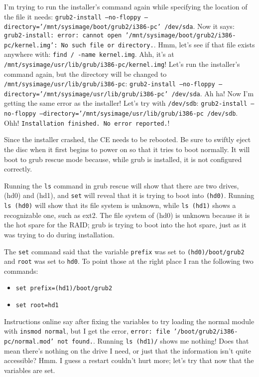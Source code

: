\documentclass[12pt]{article}
\begin{document}
\qq I'm trying to run the installer's command again while specifying the
location of the file it needs: {\tt grub2-install --no-floppy
  --directory='/mnt/sysimage/boot/grub2/i386-pc' /dev/sda}. Now it says:
{\tt grub2-install: error: cannot open
  '/mnt/sysimage/boot/grub2/i386-pc/kernel.img': No such file or
  directory.}. Hmm, let's see if that file exists anywhere with: {\tt find /
  -name kernel.img}. Ahh, it's at
{\tt /mnt/sysimage/usr/lib/grub/i386-pc/kernel.img}! Let's run the installer's
command again, but the directory will be changed to
{\tt /mnt/sysimage/usr/lib/grub/i386-pc}:
{\tt grub2-install --no-floppy --directory='/mnt/sysimage/usr/lib/grub/i386-pc'
  /dev/sda}. Ah ha! Now I'm getting the same error as the installer! Let's try
with {\tt /dev/sdb}: {\tt grub2-install --no-floppy
  --directory='/mnt/sysimage/usr/lib/grub/i386-pc /dev/sdb}. Ohh!
{\tt Installation finished. No error reported.}! 

\qq Since the installer crashed, the CE needs to be rebooted. Be sure to swiftly
eject the disc when it first begins to power on so that it tries to boot
normally. It will boot to grub rescue mode because, while grub is installed, it
is not configured correctly.

\qq Running the {\tt ls} command in grub rescue will show that there are two
drives, (hd0) and (hd1), and {\tt set} will reveal that it is trying to boot into
{\tt (hd0)}. Running {\tt ls (hd0)} will show that its file system is unknown,
while {\tt ls (hd1)} shows a recognizable one, such as ext2. The file system of
(hd0) is unknown because it is the hot spare for the RAID; grub is trying to
boot into the hot spare, just as it was trying to do during installation.

\qq The {\tt set} command said that the variable {\tt prefix} was set to
{\tt (hd0)/boot/grub2} and {\tt root} was set to {\tt hd0}. To point those at the
right place I ran the following two commands:

\begin{itemize}
  \item {\tt set prefix=(hd1)/boot/grub2}
  \item {\tt set root=hd1}
\end{itemize}

\qq Instructions online say after fixing the variables to try loading the normal
module with {\tt insmod normal}, but I get the error, {\tt error: file
  '/boot/grub2/i386-pc/normal.mod' not found.}. Running {\tt ls (hd1)/} shows me
nothing! Does that mean there's nothing on the drive I need, or just that the
information isn't quite accessible? Hmm. I guess a restart couldn't hurt more;
let's try that now that the variables are set.
\end{document}
